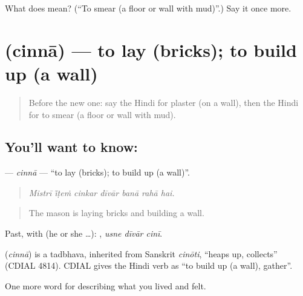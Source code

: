 \begin{tcolorbox}[breakable,colback=teal!4,colframe=teal!35!black,title={Before you move on}]
What does  mean? (\textquotedblleft{}To smear (a floor or wall with mud)\textquotedblright{}.) Say it once more.
\end{tcolorbox}
\section[\texorpdfstring{\hi{चिनना} (cinnā)}{चिनना (cinnā)}]{ (cinnā) — to lay (bricks); to build up (a wall)}

\label{lesson:HI-C517-cinna}



\begin{quote}
Before the new one: say the Hindi for plaster (on a wall), then the Hindi for to smear (a floor or wall with mud).
\end{quote}

\subsection*{You'll want to know: }
\textbf{} — \emph{cinnā} — \textquotedblleft{}to lay (bricks); to build up (a wall)\textquotedblright{}.

\begin{quote}
      
\end{quote}

\begin{quote}
\emph{Mistrī ī̃ṭeṁ cinkar dīvār banā rahā hai.}
\end{quote}

\begin{quote}
The mason is laying bricks and building a wall.
\end{quote}

Past, with  (he or she …):   , \emph{usne dīvār cinī}.

\begin{cousinweb}
\textbf{} (\emph{cinnā}) is a tadbhava, inherited from Sanskrit \emph{cinōti}, \textquotedblleft{}heaps up, collects\textquotedblright{} (CDIAL 4814). CDIAL gives the Hindi verb as \textquotedblleft{}to build up (a wall), gather\textquotedblright{}.
\end{cousinweb}

\begin{grammarlens}[title={What you've built}]
One more word for describing what you lived and felt.
\end{grammarlens}

